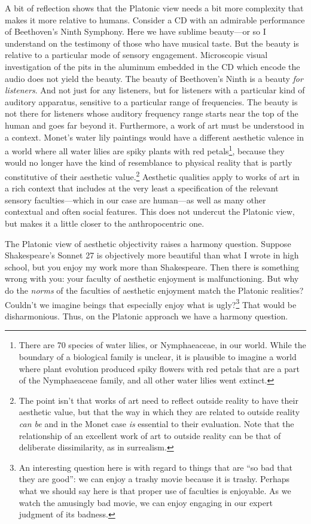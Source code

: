 A bit of reflection shows that the Platonic view needs a bit more complexity that makes it 
more relative to humans. Consider a CD with an admirable performance of Beethoven's Ninth Symphony.
Here we have sublime beauty---or so I understand on the testimony of those who have musical taste. But
the beauty is relative to a particular mode of sensory engagement. Microscopic visual investigation of the 
pits in the aluminum embedded in the CD which encode the audio does not yield the beauty. The beauty of
Beethoven's Ninth is a beauty \textit{for listeners}. And not just for any listeners, but for listeners
with a particular kind of auditory apparatus, sensitive to a particular range of frequencies. The beauty
is not there for listeners whose auditory frequency range starts near the top of the human and goes far 
beyond it. Furthermore, a work of art must be understood in a context. Monet's water lily paintings would
have a different aesthetic valence in a world where all water lilies are spiky plants with red petals\footnote{There 
are 70 species of water lilies, or Nymphaeaceae, in our world. While the boundary of a biological family is 
unclear, it is plausible to imagine a world where plant evolution produced spiky flowers with red petals
that are a part of the  Nymphaeaceae family, and all other water lilies went extinct.}, because they would
no longer have the kind of resemblance to physical reality that is partly constitutive of their aesthetic
value.\footnote{The point isn't that works of art need to reflect outside reality to have their aesthetic
value, but that the way in which they are related to outside reality \textit{can be} and in the Monet case
\textit{is} essential to their evaluation. Note that the relationship of an excellent work of art to outside 
reality can be that of deliberate dissimilarity, as in surrealism.} Aesthetic qualities apply to works of
art in a rich context that includes at the very least a specification of the relevant sensory faculties---which
in our case are human---as well as many other contextual and often social features. This does not undercut
the Platonic view, but makes it a little closer to the anthropocentric one.

The Platonic view of aesthetic objectivity raises a harmony question. Suppose Shakespeare's Sonnet 27
is objectively more beautiful than what I wrote in high school, but you enjoy my work more than 
Shakespeare. Then there is something wrong with you: your faculty of aesthetic enjoyment is malfunctioning.
But why do the \textit{norms} of the faculties of aesthetic enjoyment match the Platonic realities?
Couldn't we imagine beings that especially enjoy what is ugly?\footnote{An interesting question here is 
with regard to things that are ``so bad that they are good'': we can enjoy a trashy movie because it is
trashy. Perhaps what we should say here is that proper use of faculties is enjoyable. As we watch the
amusingly bad movie, we can enjoy engaging in our expert judgment of its badness.} That would be disharmonious.
Thus, on the Platonic approach we have a harmony question.

